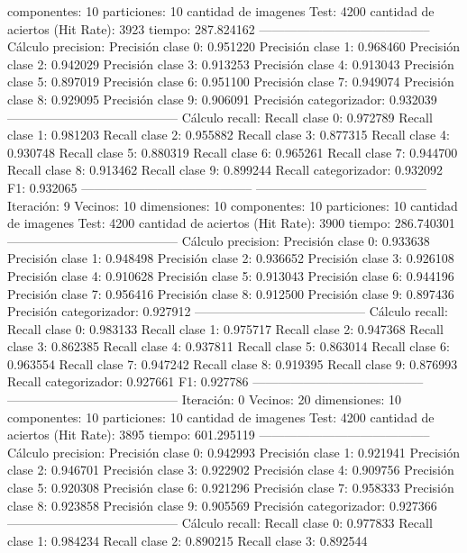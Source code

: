 componentes: 10
particiones: 10
cantidad de imagenes Test: 4200
cantidad de aciertos (Hit Rate): 3923
tiempo: 287.824162
-----------------------------------------
Cálculo precision: 
Precisión clase 0: 0.951220
Precisión clase 1: 0.968460
Precisión clase 2: 0.942029
Precisión clase 3: 0.913253
Precisión clase 4: 0.913043
Precisión clase 5: 0.897019
Precisión clase 6: 0.951100
Precisión clase 7: 0.949074
Precisión clase 8: 0.929095
Precisión clase 9: 0.906091
Precisión categorizador: 0.932039
-----------------------------------------
Cálculo recall: 
Recall clase 0: 0.972789
Recall clase 1: 0.981203
Recall clase 2: 0.955882
Recall clase 3: 0.877315
Recall clase 4: 0.930748
Recall clase 5: 0.880319
Recall clase 6: 0.965261
Recall clase 7: 0.944700
Recall clase 8: 0.913462
Recall clase 9: 0.899244
Recall categorizador: 0.932092
F1: 0.932065
-----------------------------------------
-----------------------------------------
Iteración: 9
Vecinos: 10
dimensiones: 10
componentes: 10
particiones: 10
cantidad de imagenes Test: 4200
cantidad de aciertos (Hit Rate): 3900
tiempo: 286.740301
-----------------------------------------
Cálculo precision: 
Precisión clase 0: 0.933638
Precisión clase 1: 0.948498
Precisión clase 2: 0.936652
Precisión clase 3: 0.926108
Precisión clase 4: 0.910628
Precisión clase 5: 0.913043
Precisión clase 6: 0.944196
Precisión clase 7: 0.956416
Precisión clase 8: 0.912500
Precisión clase 9: 0.897436
Precisión categorizador: 0.927912
-----------------------------------------
Cálculo recall: 
Recall clase 0: 0.983133
Recall clase 1: 0.975717
Recall clase 2: 0.947368
Recall clase 3: 0.862385
Recall clase 4: 0.937811
Recall clase 5: 0.863014
Recall clase 6: 0.963554
Recall clase 7: 0.947242
Recall clase 8: 0.919395
Recall clase 9: 0.876993
Recall categorizador: 0.927661
F1: 0.927786
-----------------------------------------
-----------------------------------------
Iteración: 0
Vecinos: 20
dimensiones: 10
componentes: 10
particiones: 10
cantidad de imagenes Test: 4200
cantidad de aciertos (Hit Rate): 3895
tiempo: 601.295119
-----------------------------------------
Cálculo precision: 
Precisión clase 0: 0.942993
Precisión clase 1: 0.921941
Precisión clase 2: 0.946701
Precisión clase 3: 0.922902
Precisión clase 4: 0.909756
Precisión clase 5: 0.920308
Precisión clase 6: 0.921296
Precisión clase 7: 0.958333
Precisión clase 8: 0.923858
Precisión clase 9: 0.905569
Precisión categorizador: 0.927366
-----------------------------------------
Cálculo recall: 
Recall clase 0: 0.977833
Recall clase 1: 0.984234
Recall clase 2: 0.890215
Recall clase 3: 0.892544
